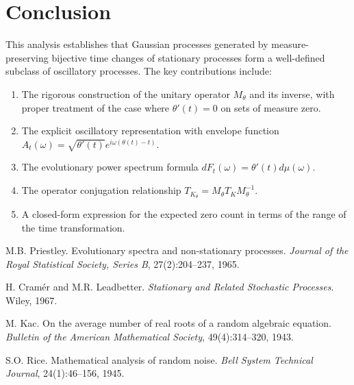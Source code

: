 \documentclass[11pt]{article}
\begin{document}
\section{Conclusion}\label{sec:conclusion}

This analysis establishes that Gaussian processes generated by measure-preserving bijective time changes of stationary processes form a well-defined subclass of oscillatory processes. The key contributions include:

\begin{enumerate}
\item The rigorous construction of the unitary operator $M_\theta$ and its inverse, with proper treatment of the case where $\theta'(t) = 0$ on sets of measure zero.
\item The explicit oscillatory representation with envelope function $A_t(\omega) = \sqrt{\theta'(t)}e^{i\omega(\theta(t)-t)}$.
\item The evolutionary power spectrum formula $dF_t(\omega) = \theta'(t)d\mu(\omega)$.
\item The operator conjugation relationship $T_{K_\theta} = M_\theta T_K M_\theta^{-1}$.
\item A closed-form expression for the expected zero count in terms of the range of the time transformation.
\end{enumerate}

\begin{thebibliography}{99}
 M.B. Priestley. Evolutionary spectra and non-stationary processes. \emph{Journal of the Royal Statistical Society, Series B}, 27(2):204--237, 1965.

 H. Cramér and M.R. Leadbetter. \emph{Stationary and Related Stochastic Processes}. Wiley, 1967.

 M. Kac. On the average number of real roots of a random algebraic equation. \emph{Bulletin of the American Mathematical Society}, 49(4):314--320, 1943.

 S.O. Rice. Mathematical analysis of random noise. \emph{Bell System Technical Journal}, 24(1):46--156, 1945.
\end{thebibliography}
\end{document}
